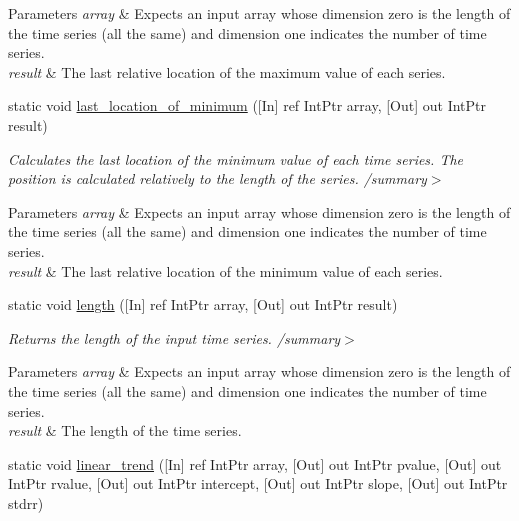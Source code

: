 \begin{DoxyCompactItemize}
\begin{DoxyCompactList}
\begin{DoxyParams}{Parameters}
{\em array} & Expects an input array whose dimension zero is the length of the time series (all the same) and dimension one indicates the number of time series.\\
\hline
{\em result} & The last relative location of the maximum value of each series.\\
\hline
\end{DoxyParams}
\end{DoxyCompactList}\item 
static void \mbox{\hyperlink{classkhiva_1_1interop_1_1_d_l_l_features_af801e4d6b8fed411a5a8bf0a3f32a631}{last\+\_\+location\+\_\+of\+\_\+minimum}} (\mbox{[}In\mbox{]} ref Int\+Ptr array, \mbox{[}Out\mbox{]} out Int\+Ptr result)
\begin{DoxyCompactList}\small\item\em Calculates the last location of the minimum value of each time series. The position is calculated relatively to the length of the series. /summary$>$ 
\begin{DoxyParams}{Parameters}
{\em array} & Expects an input array whose dimension zero is the length of the time series (all the same) and dimension one indicates the number of time series.\\
\hline
{\em result} & The last relative location of the minimum value of each series.\\
\hline
\end{DoxyParams}
\end{DoxyCompactList}\item 
static void \mbox{\hyperlink{classkhiva_1_1interop_1_1_d_l_l_features_a106f996c2c7cded64905d3dd25ed023a}{length}} (\mbox{[}In\mbox{]} ref Int\+Ptr array, \mbox{[}Out\mbox{]} out Int\+Ptr result)
\begin{DoxyCompactList}\small\item\em Returns the length of the input time series. /summary$>$ 
\begin{DoxyParams}{Parameters}
{\em array} & Expects an input array whose dimension zero is the length of the time series (all the same) and dimension one indicates the number of time series.\\
\hline
{\em result} & The length of the time series.\\
\hline
\end{DoxyParams}
\end{DoxyCompactList}\item 
static void \mbox{\hyperlink{classkhiva_1_1interop_1_1_d_l_l_features_a4dc041ded2e63f00f64a73158a1ebac9}{linear\+\_\+trend}} (\mbox{[}In\mbox{]} ref Int\+Ptr array, \mbox{[}Out\mbox{]} out Int\+Ptr pvalue, \mbox{[}Out\mbox{]} out Int\+Ptr rvalue, \mbox{[}Out\mbox{]} out Int\+Ptr intercept, \mbox{[}Out\mbox{]} out Int\+Ptr slope, \mbox{[}Out\mbox{]} out Int\+Ptr stdrr)

\end{DoxyCompactItemize}
